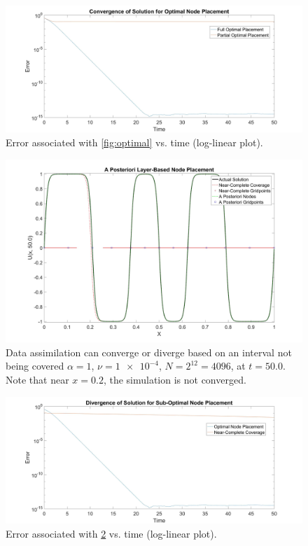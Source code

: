 \documentclass[12pt]{amsart}
\theoremstyle{plain}
\theoremstyle{definition}
\theoremstyle{remark}
\numberwithin{equation}{section} %
\numberwithin{figure}{section}   %
\begin{document}
\begin{figure}
	\centering
	\includegraphics[scale=0.15]{Error.jpg}
	\caption{Error associated with \cref{fig:optimal} vs. time (log-linear plot).}
	\label{fig:minimumGridError}
\end{figure}
\begin{figure}
	\centering
	\includegraphics[scale=0.15]{CompleteOptimal.jpg}
	\caption{Data assimilation can converge or diverge based on an interval not being covered $\alpha = 1$, $\nu=\num{1e-4}$, $N = 2^{12}=4096$, at $t=50.0$.\\Note that near $x = 0.2$, the simulation is not converged.}
	\label{fig:minimumGridFull}
\end{figure}
\begin{figure}
	\centering
	\includegraphics[scale=0.15]{CompleteError.jpg}
	\caption{Error associated with \cref{fig:minimumGridFull} vs. time  (log-linear plot).}
	\label{fig:minimumGridErrorComplete}
\end{figure}
\end{document}
